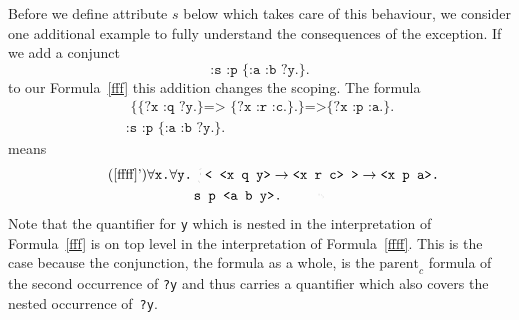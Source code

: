 Before we define attribute $s$ below which takes care of this behaviour, we consider one additional example to fully understand the consequences of the exception.
If we add a conjunct 
\[
 \texttt{:s :p \{:a :b ?y.\}.}
\]
to our Formula~\ref{fff} this addition changes the scoping. The formula
\begin{multline}\label{ffff}
\texttt{ \{\{?x :q ?y.\} => \{?x :r :c.\}.\}=>}
\texttt{\{?x :p :a.\}.}\\
 \texttt{:s :p \{:a :b ?y.\}.}
\end{multline}
means
 \begin{multline}\tag{\ref{ffff}'} \label{ffff'}
   \forall \texttt{x.}\forall \texttt{y.}\lhexbrace
  \texttt{< <x q y>} \rightarrow \texttt{<x r c> >}\rightarrow  \texttt{<x p a>.}\\
  \texttt{s p <a b y>.\rhexbrace
  }
 \end{multline}
Note that the quantifier for \texttt{y} which is nested in the interpretation of Formula~\ref{fff} is on top level in the interpretation of Formula~\ref{ffff}. 
This is the case because the conjunction, \ie the formula as a whole, is the $\text{parent}_c$ formula of the second occurrence of \texttt{?y} and thus carries a quantifier which 
also covers the nested occurrence of~\texttt{?y}.

